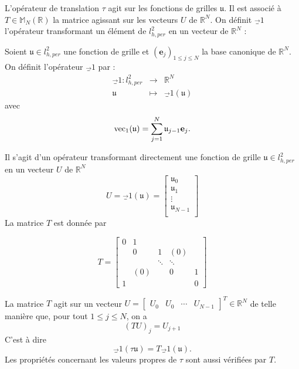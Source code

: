 L'opérateur de translation $\tau$ agit sur les fonctions de grilles $\mathfrak{u}$. Il est associé à $T \in \mathbb{M}_N \left( \mathbb{R} \right)$ la matrice agissant sur les vecteurs $U$ de $\mathbb{R}^N$.
On définit $\vec_1$ l'opérateur transformant un élément de $l_{h,per}^2$ en un vecteur de $\mathbb{R}^N$ :

\begin{definition}
Soient $\mathfrak{u} \in l^2_{h,per}$ une fonction de grille et $(\mathbf{e}_j)_{1 \leq j \leq N}$ la base canonique de $\mathbb{R}^N$. On définit l'opérateur $\vec_1$ par :
\begin{equation}
\begin{array}{rcl}
\vec_1 : l^2_{h,per} & \rightarrow & \mathbb{R}^N\\
         \mathfrak{u} & \mapsto & \vec_1 ( \mathfrak{u} ) 
\end{array}
\end{equation}
avec 
\begin{equation}
\text{vec}_1 ( \mathfrak{u} ) =\displaystyle\sum\limits_{j=1}^N \mathfrak{u}_{j-1} \mathbf{e}_j.
\end{equation}
\end{definition}

Il s'agit d'un opérateur transformant directement une fonction de grille $\mathfrak{u} \in l^2_{h,per}$ en un vecteur $U$ de $\mathbb{R}^N$ 
\begin{equation}
U = \vec_1( \mathfrak{u} ) = \begin{bmatrix}
\mathfrak{u}_0\\
\mathfrak{u}_1\\
\vdots\\
\mathfrak{u}_{N-1}\\
\end{bmatrix}
\end{equation}
La matrice $T$ est donnée par

\begin{equation}
T = \begin{bmatrix}
0 & 1 &   &   &   \\ 
  & 0 & 1 & (0) &   \\ 
  &   & \ddots & \ddots &   \\ 
  & (0) &   & 0 & 1 \\ 
1 &   &   &   & 0
\end{bmatrix} 
\end{equation}

La matrice $T$ agit sur un vecteur $U = \begin{bmatrix}
U_0 & U_0 & \cdots & U_{N-1} 
\end{bmatrix}^T \in \mathbb{R}^N $ de telle manière que, pour tout $1 \leq j \leq N$, on a 
\begin{equation}
(TU)_j = U_{j+1}
\end{equation}
C'est à dire
\begin{equation}
\vec_1 ( \tau \mathfrak{u} ) = T \vec_1 ( \mathfrak{u} ). 
\end{equation}
Les propriétés concernant les valeurs propres de $\tau$ sont aussi vérifiées par $T$.

